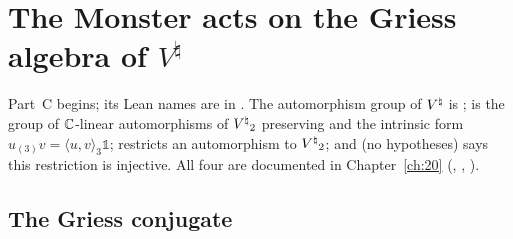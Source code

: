 \section{The Monster acts on the Griess algebra of \texorpdfstring{$V^\natural$}{V-natural}}\label{ch21:sec:action}

Part~C begins; its Lean names are in .  The automorphism group of
${V^{\natural}}$ is ;  is the group of ${\mathbb{C}}$-linear automorphisms
of ${V^{\natural}}_2$ preserving  and the intrinsic form $u_{(3)}v=\langle u,v\rangle_3\mathbb1$;
 restricts an automorphism to ${V^{\natural}}_2$; and
 (no hypotheses) says this restriction is injective.  All four are
documented in Chapter~\ref{ch:20} (,
, ).

\subsection{The Griess conjugate}

